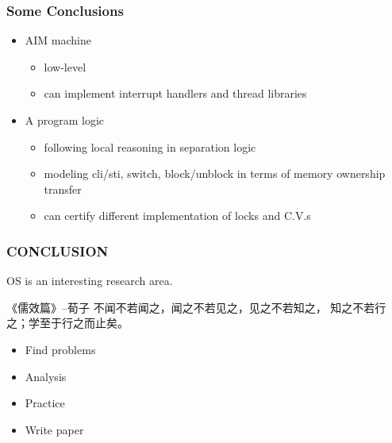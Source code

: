 \begin{frame}[plain]	
	\frametitle{Some Conclusions}
	
	\begin{itemize}\Large
		\item AIM machine
		\begin{itemize}\large
			\item low-level
			\item can implement interrupt handlers and thread libraries
			
		\end{itemize}
	
		\item A program logic
		\begin{itemize}\large
			\item following local reasoning in separation logic
			\item modeling cli/sti, switch, block/unblock in terms of
			memory ownership transfer
			\item can certify different implementation of locks and C.V.s
			
		\end{itemize}
	\end{itemize}
	
	
\end{frame}

\begin{frame}[plain]	
	\frametitle{CONCLUSION}
	
	\LARGE
	OS is an interesting research area.
	\begin{block}{《儒效篇》--荀子}
	不闻不若闻之，闻之不若见之，见之不若知之，
	知之不若行之；学至于行之而止矣。 
\end{block} 	
	\begin{itemize}\Large
			\item Find problems
			\item Analysis
			\item Practice
			\item Write paper
	\end{itemize}
     
	
\end{frame}

